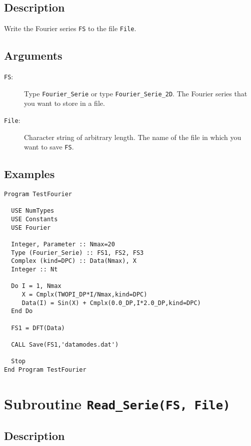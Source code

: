 \subsection{Description}

Write the Fourier series \texttt{FS} to the file \texttt{File}.

\subsection{Arguments}

\begin{description}
\item[\texttt{FS}:] Type \texttt{Fourier\_Serie} or type
  \texttt{Fourier\_Serie\_2D}. The Fourier series that you want to
  store in a file.
\item[\texttt{File}:] Character string of arbitrary length. The name
  of the file in which you want to save \texttt{FS}.
\end{description}

\subsection{Examples}

\begin{verbatim}
Program TestFourier

  USE NumTypes
  USE Constants
  USE Fourier

  Integer, Parameter :: Nmax=20
  Type (Fourier_Serie) :: FS1, FS2, FS3
  Complex (kind=DPC) :: Data(Nmax), X
  Integer :: Nt

  Do I = 1, Nmax
     X = Cmplx(TWOPI_DP*I/Nmax,kind=DPC)
     Data(I) = Sin(X) + Cmplx(0.0_DP,I*2.0_DP,kind=DPC)
  End Do

  FS1 = DFT(Data)

  CALL Save(FS1,'datamodes.dat')

  Stop
End Program TestFourier
\end{verbatim}

\section{Subroutine \texttt{Read\_Serie(FS, File)}}

\subsection{Description}

